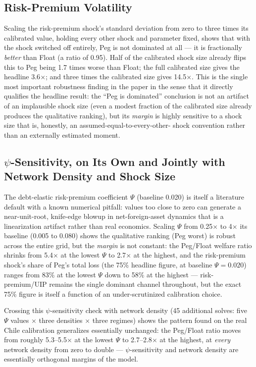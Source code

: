 \documentclass[12pt]{article}
\begin{document}
\subsection{Risk-Premium Volatility}
\label{rob:rp_vol}

Scaling the risk-premium shock's standard deviation from zero to three times its calibrated value,
holding every other shock and parameter fixed, shows that with the shock switched off entirely, Peg is
not dominated at all --- it is fractionally \emph{better} than Float (a ratio of 0.95). Half of the
calibrated shock size already flips this to Peg being 1.7 times worse than Float; the full calibrated
size gives the headline 3.6$\times$; and three times the calibrated size gives 14.5$\times$. This is
the single most important robustness finding in the paper in the sense that it directly qualifies the
headline result: the ``Peg is dominated'' conclusion is not an artifact of an implausible shock size
(even a modest fraction of the calibrated size already produces the qualitative ranking), but its
\emph{margin} is highly sensitive to a shock size that is, honestly, an assumed-equal-to-every-other-
shock convention rather than an externally estimated moment.

\subsection{$\psi$-Sensitivity, on Its Own and Jointly with Network Density and Shock Size}
\label{rob:psi}

The debt-elastic risk-premium coefficient $\Psi$ (baseline 0.020) is itself a literature default with
a known numerical pitfall: values too close to zero can generate a near-unit-root, knife-edge blowup
in net-foreign-asset dynamics that is a linearization artifact rather than real economics. Scaling
$\Psi$ from 0.25$\times$ to 4$\times$ its baseline (0.005 to 0.080) shows the qualitative ranking (Peg
worst) is robust across the entire grid, but the \emph{margin} is not constant: the Peg/Float welfare
ratio shrinks from 5.4$\times$ at the lowest $\Psi$ to 2.7$\times$ at the highest, and the risk-premium
shock's share of Peg's total loss (the 75\% headline figure, at baseline $\Psi=0.020$) ranges from 83\%
at the lowest $\Psi$ down to 58\% at the highest --- risk-premium/UIP remains the single dominant
channel throughout, but the exact 75\% figure is itself a function of an under-scrutinized calibration
choice.

Crossing this $\psi$-sensitivity check with network density (45 additional solves: five $\Psi$ values
$\times$ three densities $\times$ three regimes) shows the pattern found on the real Chile calibration
generalizes essentially unchanged: the Peg/Float ratio moves from roughly 5.3--5.5$\times$ at the
lowest $\Psi$ to 2.7--2.8$\times$ at the highest, at \emph{every} network density from zero to double
--- $\psi$-sensitivity and network density are essentially orthogonal margins of the model.
\end{document}
